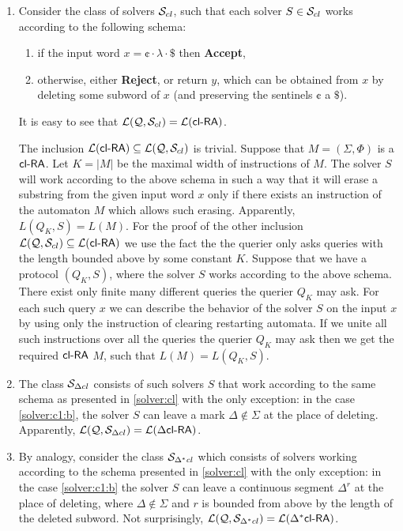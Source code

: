 \begin{enumerate}
\item\label{solver:cl}
Consider the class of solvers $\mathcal{S}_{cl}$, such that each solver $S \in \mathcal{S}_{cl}$ works according to the following schema:
\begin{enumerate}
\item \label{solver:c1:a}
      if the input word $x = \cent \cdot \lambda \cdot \$$ then
      \textbf{Accept},
\item \label{solver:c1:b}
      otherwise, either \textbf{Reject}, or return $y$, which can be
      obtained from $x$ by deleting some subword of $x$ (and
      preserving the sentinels $\cent$ a $\$$).
\end{enumerate}
It is easy to see that ${\cal L}(\mathcal{Q}, \mathcal{S}_{cl}) = {\cal L}(\textup{\sf cl-RA\/})$.

The inclusion ${\cal L}(\textup{\sf cl-RA\/}) \subseteq {\cal L}(\mathcal{Q}, \mathcal{S}_{cl})$ is trivial. Suppose that $M = (\Sigma, \Phi)$ is a $\textup{\sf cl-RA\/}$. Let $K = |M|$ be the maximal width of instructions of $M$. The solver $S$ will work according to the above schema in such a way that it will erase a substring from the given input word $x$ only if there exists an instruction of the automaton $M$ which allows such erasing. Apparently, $L(Q_K, S) = L(M)$. For the proof of the other inclusion ${\cal L}(\mathcal{Q}, \mathcal{S}_{cl}) \subseteq {\cal L}(\textup{\sf cl-RA\/})$ we use the fact the the querier only asks queries with the length bounded above by some constant $K$. Suppose that we have a protocol $(Q_K, S)$, where the solver $S$ works according to the above schema. There exist only finite many different queries the querier $Q_K$ may ask. For each such query $x$ we can describe the behavior of the solver $S$ on the input $x$ by using only the instruction of clearing restarting automata. If we unite all such instructions over all the queries the querier $Q_K$ may ask then we get the required $\textup{\sf cl-RA\/}$ $M$, such that $L(M) = L(Q_K, S)$.

\item\label{solver:dcl}
The class $\mathcal{S}_{\Delta cl}$ consists of such solvers $S$ that work according to the same schema as presented in \ref{solver:cl} with the only exception: in the case \ref{solver:c1:b}, the solver $S$ can leave a mark $\Delta \notin \Sigma$ at the place of deleting. Apparently, ${\cal L}(\mathcal{Q}, \mathcal{S}_{\Delta cl}) = {\cal L}(\textup{\sf $\Delta$cl-RA\/})$.

\item\label{solver:dxcl}
By analogy, consider the class $\mathcal{S}_{\Delta^* cl}$ which consists of solvers working according to the schema presented in \ref{solver:cl} with the only exception: in the case \ref{solver:c1:b} the solver $S$ can leave a continuous segment $\Delta^r$ at the place of deleting, where $\Delta \notin \Sigma$ and $r$ is bounded from above by the length of the deleted subword. Not surprisingly, ${\cal L}(\mathcal{Q}, \mathcal{S}_{\Delta^* cl}) = {\cal L}(\textup{\sf $\Delta^*$cl-RA\/})$.


\end{enumerate}
